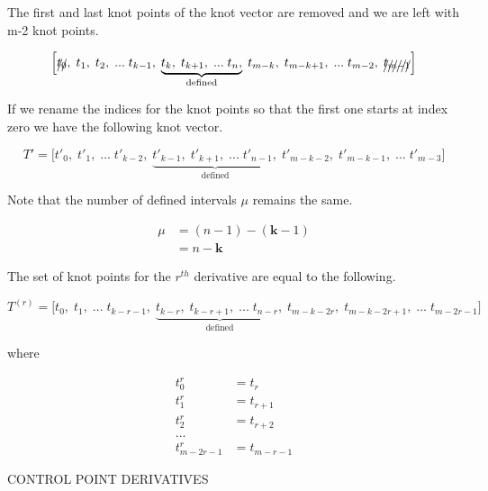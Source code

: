 \documentclass{article}
\begin{document}
The first and last knot points of the knot vector are removed and we are left with m-2 knot points.

\begin{equation}
    \Big[ \xout{t_0},\; t_1, \; t_2,  \; ... \; t_{k-1} , \; \underbrace{t_k, \; t_{k+1}, \; ... \; t_n,}_{\text{defined}} \; t_{m-k}, \; t_{m-k+1}, \; ... \; t_{m-2}, \; \xout{t_{m-1}} \Big]
\end{equation}

If we rename the indices for the knot points so that the first one starts at index zero we have the following knot vector.

\begin{equation}
    T' = \Big[ t'_0, \; t'_1,  \; ... \; t'_{k-2} , \; \underbrace{t'_{k-1}, \; t'_{k+1}, \; ... \; t'_{n-1},}_{\text{defined}} \; t'_{m-k-2}, \; t'_{m-k-1}, \; ... \; t'_{m-3} \Big]
\end{equation}

Note that the number of defined intervals \(\mu\) remains the same.

\begin{equation}
\begin{aligned}
    \mu &= (n-1) - (\textbf{k}-1) \\
    &= n - \textbf{k}
\end{aligned}
\end{equation}

The set of knot points for the \(r^{th}\) derivative are equal to the following.

\begin{equation} \label{eq:T^r}
    T^{(r)} = \Big[ t_0, \; t_1,  \; ... \; t_{k-r-1} , \; \underbrace{t_{k-r}, \; t_{k-r+1}, \; ... \; t_{n-r},}_{\text{defined}} \; t_{m-k-2r}, \; t_{m-k-2r+1}, \; ... \; t_{m-2r-1} \Big]
\end{equation}

where 

\begin{equation}
\begin{aligned}
    t^{r}_{0} &= t_{r} \\
    t^{r}_{1} &= t_{r+1} \\
    t^{r}_{2} &= t_{r+2} \\
    ... \\
    t^{r}_{m-2r-1} &= t_{m-r-1}
\end{aligned}
\end{equation}
\hspace{1cm}

CONTROL POINT DERIVATIVES
\end{document}
